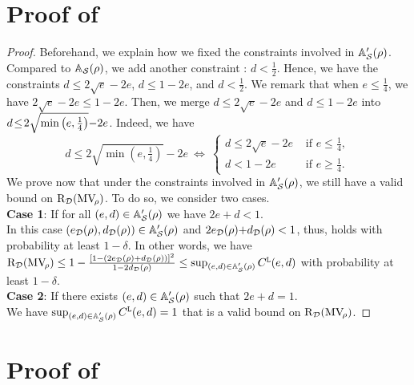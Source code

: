 \begin{noaddcontents}
\section{Proof of }
\label{ap:mv:sec:proof-new-cbound-lacasse}

\theoremnewcboundlacasse*
\begin{proof}
Beforehand, we explain how we fixed the constraints involved in $\mathbb{A}'_{\mathcal{S}}(\rho)$.
Compared to $\mathbb{A}_{\mathcal{S}}(\rho)$, we add another constraint : $d\!<\!\tfrac{1}{2}$.
Hence, we have the constraints $d\!\le\!  2\sqrt{e}{-}2e$, $d \le 1{-}2e$, and $d\!<\!\tfrac{1}{2}$. 
We remark that when $e\!\le\! \tfrac{1}{4}$, we have $2\sqrt{e}{-}2e\!\le\! 1{-}2e$.
Then, we merge $d\!\le\!  2\sqrt{e}{-}2e$ and $d\!\le\!  1{-}2e$ into $d\!\le\!  2\sqrt{\min\left( e, \tfrac{1}{4}\right)}{-}2e$.
Indeed, we have
$$d \le  2\sqrt{\min(e, \tfrac{1}{4})}{-}2e \ \Longleftrightarrow\ \left\{
\begin{array}{ll}
d \le  2\sqrt{e}-2e&\text{ if }e\le \frac{1}{4},\\[1mm]
d < 1{-}2e &\text{ if }e\geq\frac14.
\end{array}\right.$$
We prove now that under the constraints involved in $\mathbb{A}'_{\mathcal{S}}(\rho)$, we still have a valid bound on $\text{R}_{\mathcal{D}}(\text{MV}_{\!\rho})$.
To do so, we consider two cases.\\[1mm]
{\bf Case 1}: If for all $(e,d)\in \mathbb{A}'_{\mathcal{S}}(\rho)$ we have $2e{+}d<1$.\\ 
In this case $(e_{\mathcal{D}}(\rho), d_{\mathcal{D}}(\rho))\in \mathbb{A}'_{\mathcal{S}}(\rho)$ and $2e_{\mathcal{D}}(\rho){+}d_{\mathcal{D}}(\rho)<1$, thus, 
 holds with probability at least $1-\delta$. 
In other words, we have
$\text{R}_{\mathcal{D}}(\text{MV}_{\!\rho})\le1-\frac{\left[ 1-\left( 2e_{\mathcal{D}}(\rho)+d_{\mathcal{D}}(\rho)\right) \right]^2}{1-2d_{\mathcal{D}}(\rho)}
\le \sup_{(e,d)\in\mathbb{A}'_{\mathcal{S}}(\rho)}{C}^{\tt L}(e,d)$ with probability at least $1-\delta$.\\[1mm]
{\bf Case 2}: If there exists $(e,d)\in \mathbb{A}'_{\mathcal{S}}(\rho)$  such that $2e{+}d\!=\!1$.\\ 
We have $\sup_{(e,d)\in\mathbb{A}'_{\mathcal{S}}(\rho)}{C}^{\tt L}(e,d) = 1$ that is a valid bound on $\text{R}_{\mathcal{D}}(\text{MV}_{\!\rho})$.
\end{proof}

\section{Proof of }


\end{noaddcontents}
